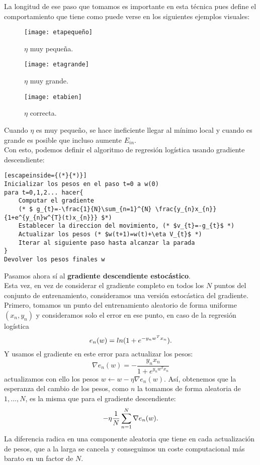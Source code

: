 La longitud de ese paso que tomamos es importante en esta técnica pues define el comportamiento que tiene como puede verse en los siguientes ejemplos visuales:
\begin{figure}[H]
  \texttt{[image: etapequeño]}
  \caption{$\eta$ muy pequeña.} \label{fig:etapequeño}
\endminipage\hfill
{}
  \texttt{[image: etagrande]}
  \caption{$\eta$ muy grande.} \label{fig:etagrande}
\endminipage\hfill
{}%
  \texttt{[image: etabien]}
  \caption{$\eta$ correcta.} \label{fig:etabien}
\endminipage
\end{figure}
Cuando $\eta$ es muy pequeño, se hace ineficiente llegar al mínimo local y cuando es grande es posible que incluso aumente $E_{in}$.\\
Con esto, podemos definir el algoritmo de regresión logística usando gradiente descendiente:
\begin{lstlisting}[escapeinside={(*}{*)}]
Inicializar los pesos en el paso t=0 a w(0)
para t=0,1,2... hacer{
	Computar el gradiente
	(* $ g_{t}=-\frac{1}{N}\sum_{n=1}^{N} \frac{y_{n}x_{n}}{1+e^{y_{n}w^{T}(t)x_{n}}} $*)
	Establecer la direccion del movimiento, (* $v_{t}=-g_{t}$ *)
	Actualizar los pesos (* $w(t+1)=w(t)+\eta V_{t}$ *)
	Iterar al siguiente paso hasta alcanzar la parada
}
Devolver los pesos finales w
\end{lstlisting} 
Pasamos ahora sí al \textbf{gradiente descendiente estocástico}.\\
Esta vez, en vez de considerar el gradiente completo en todos los $N$ puntos del conjunto de entrenamiento, consideramos una versión estocástica del gradiente. Primero, tomamos un punto del entrenamiento aleatorio de forma uniforme $(x_{n},y_{n})$ y consideramos solo el error en ese punto, en caso de la regresión logística
\[e_{n}(w)=ln(1+e^{-y_{n}w^{T}x_{n}}) \textnormal{.}\]
Y usamos el gradiente en este error para actualizar los pesos:
\[ \nabla e_{n}(w) = -\frac{y_{n}x_{n}}{1+e^{y_{n}w^{T}x_{n}}} \]
actualizamos con ello los pesos $w \leftarrow w -\eta \nabla e_{n}(w)$. Así, obtenemos que la esperanza del cambio de los pesos, como $n$ la tomamos de forma aleatoria de {$1,...,N$}, es la misma que para el gradiente descendiente:
\[ -\eta \frac{1}{N} \sum_{n=1}^{N} \nabla e_{n}(w) \textnormal{.} \]
La diferencia radica en una componente aleatoria que tiene en cada actualización de pesos, que a la larga se cancela y conseguimos un coste computacional más barato en un factor de $N$. \cite{abu2012learning}\\
